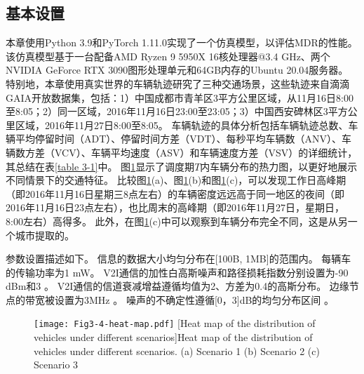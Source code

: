 \subsection{基本设置}
本章使用Python 3.9和PyTorch 1.11.0实现了一个仿真模型，以评估MDR的性能。
该仿真模型基于一台配备AMD Ryzen 9 5950X 16核处理器@3.4 GHz、两个NVIDIA GeForce RTX 3090图形处理单元和64GB内存的Ubuntu 20.04服务器。
特别地，本章使用真实世界的车辆轨迹研究了三种交通场景，这些轨迹来自滴滴GAIA开放数据集，包括：1）中国成都市青羊区3平方公里区域，从11月16日8:00至8:05；2）同一区域，2016年11月16日23:00至23:05；3）中国西安碑林区3平方公里区域，2016年11月27日8:00至8:05。
车辆轨迹的具体分析包括车辆轨迹总数、车辆平均停留时间（ADT）、停留时间方差（VDT）、每秒平均车辆数（ANV）、车辆数方差（VCV）、车辆平均速度（ASV）和车辆速度方差（VSV）的详细统计，其总结在表\ref{table 3-1}中。
图\ref{fig 3-4}显示了调度期$T$内车辆分布的热力图，以更好地展示不同情景下的交通特征。
比较图\ref{fig 3-4}(a)、图\ref{fig 3-4}(b)和图\ref{fig 3-4}(c)，可以发现工作日高峰期（即2016年11月16日星期三8点左右）的车辆密度远远高于同一地区的夜间（即2016年11月16日23点左右），也比周末的高峰期（即2016年11月27日，星期日，8:00左右）高得多。
此外，在图\ref{fig 3-4}(c)中可以观察到车辆分布完全不同，这是从另一个城市提取的。

参数设置描述如下。
信息的数据大小均匀分布在[100B, 1MB]的范围内。
每辆车的传输功率为1 mW。
V2I通信的加性白高斯噪声和路径损耗指数分别设置为-90 dBm和3 \cite{sadek2009distributed}。
V2I通信的信道衰减增益遵循均值为2、方差为0.4的高斯分布。
边缘节点的带宽被设置为3MHz \cite{wang2019delay}。
噪声的不确定性遵循[0，3]dB的均匀分布区间 \cite{tandra2008snr}。

\begin{table}[ht]
\centering
{}
\label{table 3-1}
\end{table}

\begin{figure}[h]
\centering
  \texttt{[image: Fig3-4-heat-map.pdf]}
  [Heat map of the distribution of vehicles under different scenarios]{Heat map of the distribution of vehicles under different scenarios. (a) Scenario 1 (b) Scenario 2 (c) Scenario 3}
  \label{fig 3-4}
\end{figure} 

